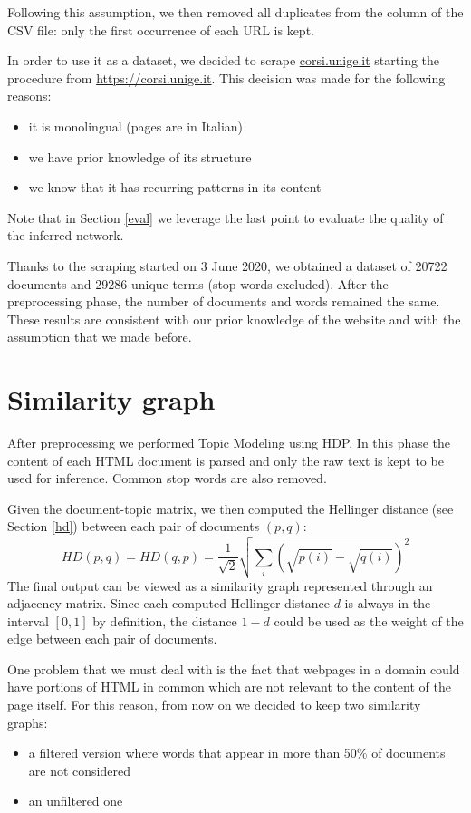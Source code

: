 Following this assumption, we then removed all duplicates from the  column
of the CSV file: only the first occurrence of each URL is kept.

In order to use it as a dataset, we decided to scrape \url{corsi.unige.it} starting the procedure from \url{https://corsi.unige.it}. 
This decision was made for the following reasons:
\begin{itemize}
    \item it is monolingual (pages are in Italian)
    \item we have prior knowledge of its structure 
    \item we know that it has recurring patterns in its content
\end{itemize}
Note that in Section \ref{eval} we leverage the last point to evaluate the quality of the inferred network.

Thanks to the scraping started on 3 June 2020, we obtained a dataset of 20722 documents and 29286 unique terms (stop words excluded). 
After the preprocessing phase, the number of documents and words remained the same.
These results are consistent with our prior knowledge of the website and with the assumption that we made before.



\section{Similarity graph} \label{sgexp}
After preprocessing we performed Topic Modeling using HDP. 
In this phase the content of each HTML document is
parsed and only the raw text is kept to be used for inference. Common stop words are also removed.

Given the document-topic matrix,
we then computed the Hellinger distance (see Section \ref{hd}) between each pair of documents $(p, q)$:
\[\mathit{HD}(p, q) = \mathit{HD}(q, p) = \frac{1}{\sqrt{2}} \sqrt{\sum_i (\sqrt{p(i)} - \sqrt{q(i)})^2}\]
The final output can be viewed as a similarity graph represented through an adjacency matrix.
Since each computed Hellinger distance $d$ is always in the interval $[0, 1]$ by definition, the distance 
$1-d$ could be used as the weight of the edge between each pair of documents.

One problem that we must deal with is the fact that
webpages in a domain could have portions of HTML in common which are not relevant to the content of the page itself.
For this reason, from now on we decided to keep two similarity graphs:
\begin{itemize}
    \item a filtered version where words that appear in more than 50\% of documents are not considered
    \item an unfiltered one
\end{itemize}


